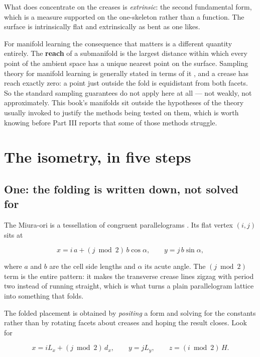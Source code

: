 \documentclass[
  british,
  a4paper,
]{book}
\begin{document}
What does concentrate on the creases is \emph{extrinsic}: the second fundamental
form, which is a measure supported on the one-skeleton rather than a function.
The surface is intrinsically flat and extrinsically as bent as one likes.

For manifold learning the consequence that matters is a different quantity
entirely. The \textbf{reach} of a submanifold \citep{federer1959curvature} is the largest
distance within which every point of the ambient space has a unique nearest
point on the surface. Sampling theory for manifold learning is generally stated
in terms of it \citep{niyogi2008homology}, and a crease has reach exactly zero: a
point just outside the fold is equidistant from both facets. So the standard
sampling guarantees do not apply here at all --- not weakly, not approximately.
This book's manifolds sit outside the hypotheses of the theory usually invoked
to justify the methods being tested on them, which is worth knowing before Part
III reports that some of those methods struggle.

\section{The isometry, in five steps}\label{geom-core}

\subsection{One: the folding is written down, not solved for}\label{one-the-folding-is-written-down-not-solved-for}

The Miura-ori is a tessellation of congruent parallelograms \citep{miura1985method}.
Its flat vertex \((i, j)\) sits at

\[x = i\,a + (j \bmod 2)\, b \cos\alpha, \qquad y = j\, b \sin\alpha,\]

where \(a\) and \(b\) are the cell side lengths and \(\alpha\) its acute angle. The
\((j \bmod 2)\) term is the entire pattern: it makes the transverse crease lines
zigzag with period two instead of running straight, which is what turns a plain
parallelogram lattice into something that folds.

The folded placement is obtained by \emph{positing} a form and solving for the
constants rather than by rotating facets about creases and hoping the result
closes. Look for

\[x = i L_x + (j \bmod 2)\, d_x, \qquad y = j L_y, \qquad z = (i \bmod 2)\, H .\]
\end{document}
